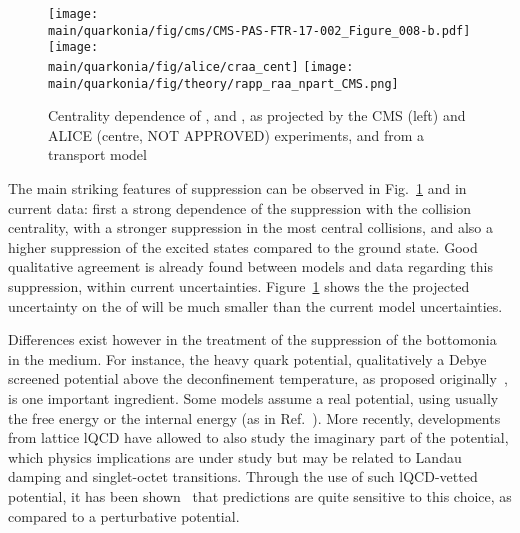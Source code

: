 \documentclass[../report.tex]{subfiles}
\providecommand{\main}{..}
\begin{document}

\begin{figure}
\begin{center}
 \texttt{[image: \\main/quarkonia/fig/cms/CMS-PAS-FTR-17-002\_Figure\_008-b.pdf]}
 \texttt{[image: \\main/quarkonia/fig/alice/craa\_cent]}
 \texttt{[image: \\main/quarkonia/fig/theory/rapp\_raa\_npart\_CMS.png]}
\end{center}

 \caption{Centrality dependence of ,  and  \raa, as projected by the CMS\cite{CMS-PAS-FTR-17-002,Krouppa:2016jcl} (left) and ALICE (centre,
 NOT APPROVED) experiments, and from a transport model\cite{Du:2017qkv}}
 \label{fig:upsi_raa_npart}
\end{figure}

% 


The main striking features of \PGU suppression can be observed in Fig.~\ref{fig:upsi_raa_npart} and in current data: first a strong dependence of the suppression with the collision
centrality, with a stronger suppression in the most central collisions, and also a higher suppression of the excited states compared to the ground state. Good qualitative agreement
is already found between models and data regarding this suppression, within current uncertainties. Figure~\ref{fig:upsi_raa_npart} shows the the projected uncertainty on the \raa of  will be much smaller than the current model uncertainties.

Differences exist however in the treatment of the suppression of the bottomonia in the medium.
For instance, the heavy quark potential, qualitatively a Debye screened potential above the deconfinement temperature, as proposed originally~\cite{Matsui:1986dk}, is one important
ingredient. Some models assume a real potential, using usually the free energy or the internal energy (as in Ref.~\cite{Du:2017qkv}). More recently, developments from lattice lQCD
have allowed to also study the imaginary part of the potential, which physics implications are under study but may be related to Landau damping and singlet-octet transitions. Through the 
use of such lQCD-vetted potential, it has been shown~\cite{Krouppa:2017jlg} that predictions are quite sensitive to this choice, as compared to a perturbative potential. 
\end{document}
